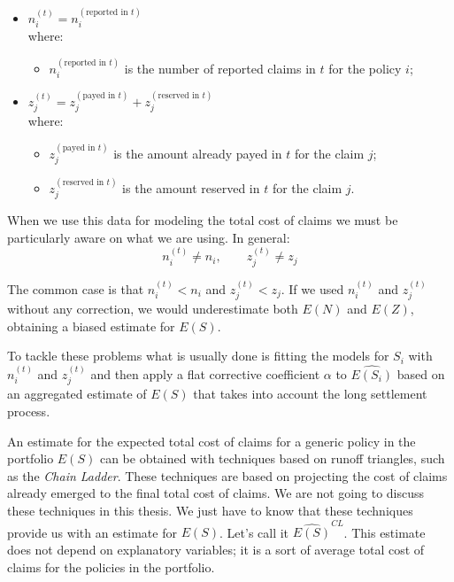 \documentclass[a4paper, nobind]{templates/ociamthesis}
\providecommand{\tightlist}{%
  \setlength{\itemsep}{0pt}\setlength{\parskip}{0pt}}
\theoremstyle{definition}
\theoremstyle{definition}
\theoremstyle{definition}
\theoremstyle{remark}
\begin{document}
\begin{itemize}
\tightlist
\item
  \(n_i^{(t)} = n_i^{(\text{reported in } t)}\)\\
  where:

  \begin{itemize}
  \tightlist
  \item
    \(n_i^{(\text{reported in } t)}\) is the number of reported claims in \(t\) for the policy \(i\);
  \end{itemize}
\item
  \(z_j^{(t)} = z_j^{(\text{payed in }t)} + z_j^{(\text{reserved in } t)}\)\\
  where:

  \begin{itemize}
  \tightlist
  \item
    \(z_j^{(\text{payed in }t)}\) is the amount already payed in \(t\) for the claim \(j\);
  \item
    \(z_j^{(\text{reserved in } t)}\) is the amount reserved in \(t\) for the claim \(j\).
  \end{itemize}
\end{itemize}

When we use this data for modeling the total cost of claims we must be particularly aware on what we are using. In general:
\[
n_i^{(t)} \ne n_i, \qquad z_j^{(t)} \ne z_j
\]

The common case is that \(n_i^{(t)} < n_i\) and \(z_j^{(t)} < z_j\). If we used \(n_i^{(t)}\) and \(z_j^{(t)}\) without any correction, we would underestimate both \(E(N)\) and \(E(Z)\), obtaining a biased estimate for \(E(S)\).

To tackle these problems what is usually done is fitting the models for \(S_i\) with \(n_i^{(t)}\) and \(z_j^{(t)}\) and then apply a flat corrective coefficient \(\alpha\) to \(\widehat{E(S_i)}\) based on an aggregated estimate of \(E(S)\) that takes into account the long settlement process.

An estimate for the expected total cost of claims for a generic policy in the portfolio \(E(S)\) can be obtained with techniques based on runoff triangles, such as the \emph{Chain Ladder}. These techniques are based on projecting the cost of claims already emerged to the final total cost of claims. We are not going to discuss these techniques in this thesis. We just have to know that these techniques provide us with an estimate for \(E(S)\). Let's call it \(\widehat{E(S)}^{CL}\). This estimate does not depend on explanatory variables; it is a sort of average total cost of claims for the policies in the portfolio.
\end{document}
